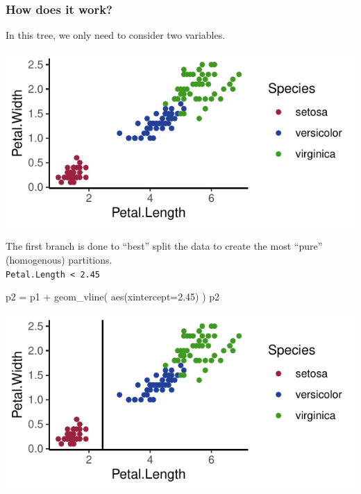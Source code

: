 \documentclass[a4paper]{article}\usepackage[]{graphicx}\usepackage[]{xcolor}
\makeatletter
\def\maxwidth{ %
  \ifdim\Gin@nat@width>\linewidth
    \linewidth
  \else
    \Gin@nat@width
  \fi
}
\makeatother
\begin{document}
\subsubsection{How does it work?}
In this tree, we only need to consider two variables.
\begin{Schunk}


{\centering \includegraphics[width=\maxwidth]{figure/listings-unnamed-chunk-429-1} 

}

\end{Schunk}
The first branch is done to ``best'' split the data to create the most ``pure'' (homogenous) partitions.\\
\lstinline|Petal.Length < 2.45|
\begin{Schunk}
\begin{Sinput}
p2 = p1 + 
  geom_vline(
    aes(xintercept=2.45)
  )
p2
\end{Sinput}


{\centering \includegraphics[width=\maxwidth]{figure/listings-unnamed-chunk-430-1} 

}

\end{Schunk}
\end{document}
